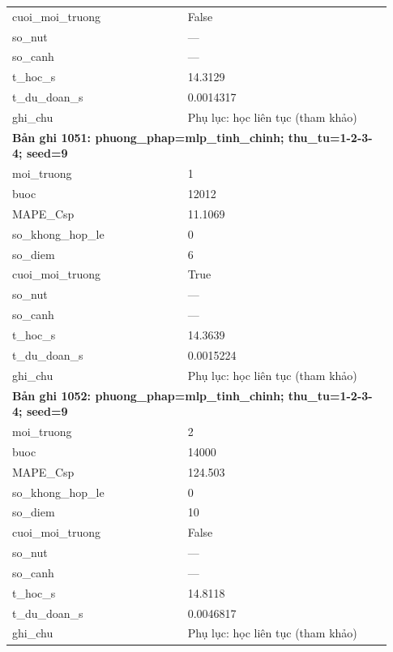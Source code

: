 \begin{longtable}{p{0.43\linewidth}p{0.50\linewidth}}
cuoi\_\allowbreak moi\_\allowbreak truong & False \\
so\_\allowbreak nut & — \\
so\_\allowbreak canh & — \\
t\_\allowbreak hoc\_\allowbreak s & 14.3129 \\
t\_\allowbreak du\_\allowbreak doan\_\allowbreak s & 0.0014317 \\
ghi\_\allowbreak chu & Phụ lục: học liên tục (tham khảo) \\
\midrule
\multicolumn{2}{p{0.95\linewidth}}{\textbf{Bản ghi 1051: phuong\_phap=mlp\_tinh\_chinh; thu\_tu=1-2-3-4; seed=9}} \\
moi\_\allowbreak truong & 1 \\
buoc & 12012 \\
MAPE\_\allowbreak Csp & 11.1069 \\
so\_\allowbreak khong\_\allowbreak hop\_\allowbreak le & 0 \\
so\_\allowbreak diem & 6 \\
cuoi\_\allowbreak moi\_\allowbreak truong & True \\
so\_\allowbreak nut & — \\
so\_\allowbreak canh & — \\
t\_\allowbreak hoc\_\allowbreak s & 14.3639 \\
t\_\allowbreak du\_\allowbreak doan\_\allowbreak s & 0.0015224 \\
ghi\_\allowbreak chu & Phụ lục: học liên tục (tham khảo) \\
\midrule
\multicolumn{2}{p{0.95\linewidth}}{\textbf{Bản ghi 1052: phuong\_phap=mlp\_tinh\_chinh; thu\_tu=1-2-3-4; seed=9}} \\
moi\_\allowbreak truong & 2 \\
buoc & 14000 \\
MAPE\_\allowbreak Csp & 124.503 \\
so\_\allowbreak khong\_\allowbreak hop\_\allowbreak le & 0 \\
so\_\allowbreak diem & 10 \\
cuoi\_\allowbreak moi\_\allowbreak truong & False \\
so\_\allowbreak nut & — \\
so\_\allowbreak canh & — \\
t\_\allowbreak hoc\_\allowbreak s & 14.8118 \\
t\_\allowbreak du\_\allowbreak doan\_\allowbreak s & 0.0046817 \\
ghi\_\allowbreak chu & Phụ lục: học liên tục (tham khảo) \\

\end{longtable}
